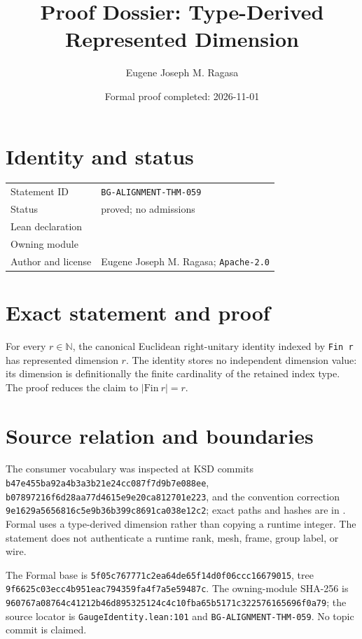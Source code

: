 \documentclass[10pt]{article}
\title{Proof Dossier: Type-Derived Represented Dimension}
\author{Eugene Joseph M. Ragasa}
\date{Formal proof completed: 2026-11-01}
\begin{document}
\raggedright
\maketitle

\section{Identity and status}
\begin{tabularx}{\textwidth}{@{}lY@{}}
\toprule
Statement ID & \texttt{BG-ALIGNMENT-THM-059} \\
Status & proved; no admissions \\
Lean declaration &  \\
Owning module &  \\
Author and license & Eugene Joseph M. Ragasa; \texttt{Apache-2.0} \\
\bottomrule
\end{tabularx}

\section{Exact statement and proof}
For every $r\in\mathbb N$, the canonical Euclidean right-unitary identity indexed by
\texttt{Fin r} has represented dimension $r$. The identity stores no independent dimension value:
its dimension is definitionally the finite cardinality of the retained index type. The proof reduces
the claim to $|\mathrm{Fin}\ r|=r$.

\section{Source relation and boundaries}
The consumer vocabulary was inspected at KSD commits
\texttt{b47e455ba92a4b3a3b21e24cc087f7d9b7e088ee},
\texttt{b07897216f6d28aa77d4615e9e20ca812701e223}, and the convention correction
\texttt{9e1629a5656816c5e9b36b399c8691ca038e12c2}; exact paths and hashes are in
. Formal uses a type-derived dimension rather than copying a runtime
integer. The statement does not authenticate a runtime rank, mesh, frame, group label, or wire.

The Formal base is \texttt{5f05c767771c2ea64de65f14d0f06ccc16679015}, tree
\texttt{9f6625c03ecc4b951eac794359fa4f7a5e59487c}. The owning-module SHA-256 is
\texttt{960767a08764c41212b46d895325124c4c10fba65b5171c322576165696f0a79}; the source locator is
\texttt{GaugeIdentity.lean:101} and \texttt{BG-ALIGNMENT-THM-059}. No topic commit is claimed.
\end{document}
